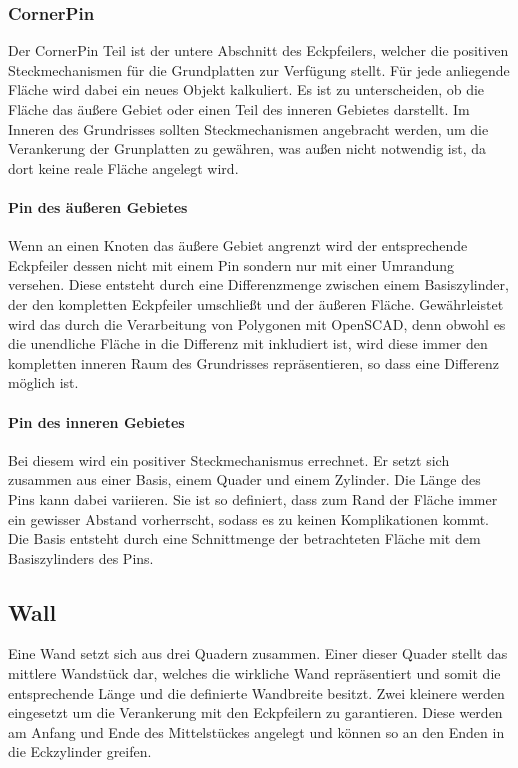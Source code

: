 \subsubsection{CornerPin}
Der CornerPin Teil ist der untere Abschnitt des Eckpfeilers, welcher die positiven Steckmechanismen für die Grundplatten zur Verfügung stellt.
Für jede anliegende Fläche wird dabei ein neues Objekt kalkuliert.
Es ist zu unterscheiden, ob die Fläche das äußere Gebiet oder einen Teil des inneren Gebietes darstellt.
Im Inneren des Grundrisses sollten Steckmechanismen angebracht werden, um die Verankerung der Grunplatten zu gewähren, was außen nicht notwendig ist, da dort keine reale Fläche angelegt wird.
\paragraph{Pin des äußeren Gebietes}
Wenn an einen Knoten das äußere Gebiet angrenzt wird der entsprechende Eckpfeiler dessen nicht mit einem Pin sondern nur mit einer Umrandung versehen.
Diese entsteht durch eine Differenzmenge zwischen einem Basiszylinder, der den kompletten Eckpfeiler umschließt und der äußeren Fläche.
Gewährleistet wird das durch die Verarbeitung von Polygonen mit OpenSCAD, denn obwohl es die unendliche Fläche in die Differenz mit inkludiert ist, wird diese immer den kompletten inneren Raum des Grundrisses repräsentieren, so dass eine Differenz möglich ist.
\paragraph{Pin des inneren Gebietes}
Bei diesem wird ein positiver Steckmechanismus errechnet.
Er setzt sich zusammen aus einer Basis, einem Quader und einem Zylinder.
Die Länge des Pins kann dabei variieren.
Sie ist so definiert, dass zum Rand der Fläche immer ein gewisser Abstand vorherrscht, sodass es zu keinen Komplikationen kommt.
Die Basis entsteht durch eine Schnittmenge der betrachteten Fläche mit dem Basiszylinders des Pins.
\subsection{Wall}
Eine Wand setzt sich aus drei Quadern zusammen. 
Einer dieser Quader stellt das mittlere Wandstück dar, welches die wirkliche Wand repräsentiert und somit die entsprechende Länge und die definierte  Wandbreite besitzt.
Zwei kleinere werden eingesetzt um die Verankerung mit den Eckpfeilern zu garantieren.
Diese werden am Anfang und Ende des Mittelstückes angelegt und können so an den Enden in die Eckzylinder greifen.
